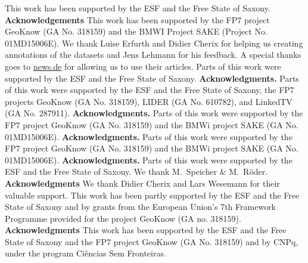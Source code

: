 This work has been supported by the ESF and the Free State of Saxony.
\textbf{Acknowledgements} This work has been supported by the FP7 project GeoKnow (GA No. 318159) and the BMWI Project SAKE (Project No. 01MD15006E).
We thank Luise Erfurth and Didier Cherix for helping us creating annotations of the datasets and Jens Lehmann for his feedback. A special thanks goes to \url{news.de} for allowing us to use their articles. Parts of this work were supported by the ESF and the Free State of Saxony.
\textbf{Acknowledgments.} Parts of this work were supported by the ESF and the Free State of Saxony, the FP7 projects GeoKnow (GA No. 318159), LIDER (GA No. 610782), and LinkedTV (GA No. 287911).
\textbf{Acknowledgments.} Parts of this work were supported by the FP7 project GeoKnow (GA No. 318159) and the BMWi project SAKE (GA No. 01MD15006E). 
\textbf{Acknowledgments.} Parts of this work were supported by the FP7 project GeoKnow (GA No. 318159) and the BMWi project SAKE (GA No. 01MD15006E). 
\textbf{Acknowledgments.} Parts of this work were supported by the ESF and the Free State of Saxony. We thank M.~Speicher \& M.~R\"oder.
\textbf{Acknowledgments} We thank Didier Cherix and Lars Wesemann for their valuable support. This work has been partly supported by the ESF and the Free State of Saxony and by grants from the European Union's 7th Framework Programme provided for the project GeoKnow (GA no. 318159).\\
\textbf{Acknowledgments}
This work has been supported by the ESF and the Free State of Saxony and the FP7 project GeoKnow (GA No. 318159) and by CNPq, under the program Ciências Sem Fronteiras.

\endgroup



